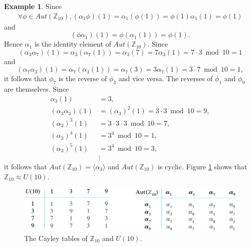 \documentclass{article}
\theoremstyle{definition}
\newtheorem{example}{Example}[section]
\begin{document}
\begin{example}
     Since
     \begin{align*}
         \forall \phi \in Aut(\mathbb{Z}_{10}), (\alpha_1\phi)(1) = \alpha_1(\phi(1)) = \phi(1)\alpha_1(1) = \phi(1)
     \end{align*}
     and 
     \begin{equation*}
         (\phi\alpha_1)(1) = \phi(\alpha_1(1)) = \phi(1).
     \end{equation*}
     Hence $\alpha_1$ is the identity element of $Aut(\mathbb{Z}_{10})$. Since
     \begin{equation*}
         (\alpha_3\alpha_7)(1) = \alpha_3(\alpha_7(1)) = \alpha_3(7) = 7 \alpha_3(1) = 7\cdot3\bmod10 = 1
     \end{equation*}
     and
     \begin{equation*}
         (\alpha_7\alpha_3)(1) = \alpha_7(\alpha_3(1)) = \alpha_7(3) = 3 \alpha_7(1) = 3\cdot7\bmod10 = 1,
     \end{equation*}
     it follows that $\phi_7$ is the reverse of $\phi_3$ and vice versa. The reverses of $\phi_1$ and $\phi_9$ are themselves. Since
     \begin{align*}
         \alpha_3(1) &= 3, \\
         (\alpha_3\alpha_3)(1) &= (\alpha_3)^2(1) = 3 \cdot 3 \bmod 10 = 9, \\
         (\alpha_3)^3(1) &= 3\cdot3\cdot3\bmod10 = 7, \\
         (\alpha_3)^4(1) &= 3^4\bmod10 = 1, \\
         (\alpha_3)^5(1) &= 3^4\bmod10 = 3, \\
         & \vdots
     \end{align*}
     it follows that $Aut(\mathbb{Z}_{10}) = \langle \alpha_3 \rangle$ and $Aut(\mathbb{Z}_{10})$ is cyclic. Figure \ref{exp6.17} shows that $\mathbb{Z}_{10} \approx U(10)$.
     
     \begin{figure}[!htpb]
         \centering
         \includegraphics[width=\linewidth]{figures/exp6.17.png}
         \caption{The Cayley tables of $\mathbb{Z}_{10}$ and $U(10)$.}
         \label{exp6.17}
     \end{figure}
 \end{example}
\end{document}
